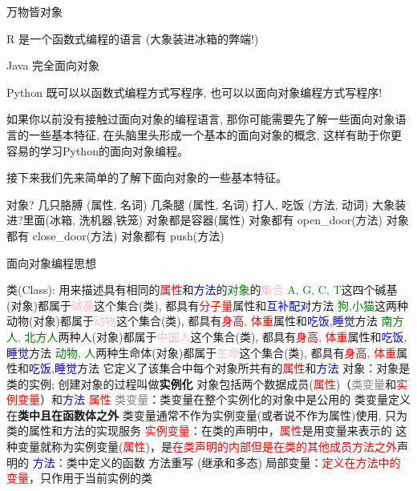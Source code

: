 \begin{frame}{万物皆对象}
    \tiny{
        R 是一个函数式编程的语言 (大象装进冰箱的弊端!)

        Java 完全面向对象

        Python 既可以以函数式编程方式写程序, 也可以以面向对象编程方式写程序!

        如果你以前没有接触过面向对象的编程语言, 那你可能需要先了解一些面向对象语言的一些基本特征, 在头脑里头形成一个基本的面向对象的概念, 这样有助于你更容易的学习Python的面向对象编程。
    
        接下来我们先来简单的了解下面向对象的一些基本特征。

        \begin{myoutline}
            \1 对象?
                \2 几只胳膊 (属性, 名词)
                \2 几条腿 (属性, 名词)
                \2 打人, 吃饭 (方法, 动词)
            \1 大象装进?里面(冰箱, 洗机器,铁笼)
                \2 对象都是容器(属性)
                \2 对象都有 open\_door(方法)
                \2 对象都有 close\_door(方法)
                \2 对象都有 push(方法)
        \end{myoutline}
    }
\end{frame}

\begin{frame}{面向对象编程思想}
    \small
    \begin{myoutline}
        \1 类(Class):
            \2 用来描述具有相同的\textcolor{red}{属性}和\textcolor{blue}{方法}的\textcolor{green}{对象}的\textcolor{pink}{集合}
                    \3 \textcolor{green}{A, G, C, T}这四个碱基(对象)都属于\textcolor{pink}{碱基}这个集合(类), 都具有\textcolor{red}{分子量}属性和\textcolor{blue}{互补配对}方法
                    \3 \textcolor{green}{狗,小猫}这两种动物(对象)都属于\textcolor{pink}{动物}这个集合(类), 都具有\textcolor{red}{身高, 体重}属性和\textcolor{blue}{吃饭,睡觉}方法
                    \3 \textcolor{green}{南方人,  北方人}两种人(对象)都属于\textcolor{pink}{中国人}这个集合(类), 都具有\textcolor{red}{身高, 体重}属性和\textcolor{blue}{吃饭,睡觉}方法
                    \3 \textcolor{green}{动物, 人}两种生命体(对象)都属于\textcolor{pink}{生命}这个集合(类), 都具有\textcolor{red}{身高, 体重}属性和\textcolor{blue}{吃饭,睡觉}方法
            \2 它定义了该集合中每个对象所共有的\textcolor{red}{属性}和\textcolor{blue}{方法}
        \1 对象：对象是类的实例; 创建对象的过程叫做\textbf{实例化}
            \2 对象包括两个数据成员(\textcolor{red}{属性})（\textcolor{gray}{类变量}和\textcolor{red}{实例变量}）和\textcolor{blue}{方法}
        \1 \textcolor{red}{属性}
            \2 \textcolor{gray}{类变量}：类变量在整个实例化的对象中是公用的
                \3 类变量定义在\textbf{类中且在函数体之外}
                \3 类变量通常不作为实例变量(或者说不作为属性)使用, 只为类的属性和方法的实现服务
            \2 \textcolor{red}{实例变量}：在类的声明中，\textcolor{red}{属性}是用变量来表示的
                \3 这种变量就称为实例变量(\textcolor{red}{属性})，是\textcolor{red}{在类声明的内部但是在类的其他成员方法之外}声明的
        \1 \textcolor{blue}{方法}：类中定义的函数
            \2 方法重写 (继承和多态)
            \2 局部变量：\textcolor{red}{定义在方法中的变量}，只作用于当前实例的类
    \end{myoutline}
\end{frame}


